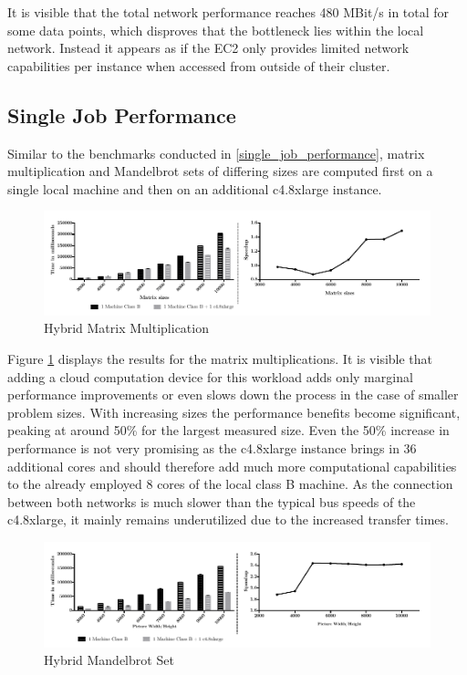 It is visible that the total network performance reaches 480 MBit/s in total for some data points, which disproves that the bottleneck lies within the local network. Instead it appears as if the EC2 only provides limited network capabilities per instance when accessed from outside of their cluster.

\subsection{Single Job Performance}

Similar to the benchmarks conducted in \ref{single_job_performance}, matrix multiplication and Mandelbrot sets of differing sizes are computed first on a single local machine and then on an additional c4.8xlarge instance.

\begin{figure}[H]
	\includegraphics[width=1.0\textwidth]{images/hybrid_matrix_multiplication.pdf}
	\centering
	\caption{Hybrid Matrix Multiplication}
	\label{img:hybrid_matrix_multiplication}
\end{figure}

Figure \ref{img:hybrid_matrix_multiplication} displays the results for the matrix multiplications. It is visible that adding a cloud computation device for this workload adds only marginal performance improvements or even slows down the process in the case of smaller problem sizes. With increasing sizes the performance benefits become significant, peaking at around 50\% for the largest measured size. Even the 50\% increase in performance is not very promising as the c4.8xlarge instance brings in 36 additional cores and should therefore add much more computational capabilities to the already employed 8 cores of the local class B machine. As the connection between both networks is much slower than the typical bus speeds of the c4.8xlarge, it mainly remains underutilized due to the increased transfer times.


\begin{figure}[H]	
	\includegraphics[width=1.0\textwidth]{images/hybrid_mandelbrot_performance.pdf}
	\centering
	\caption{Hybrid Mandelbrot Set}
	\label{img:hybrid_mandelbrot}
\end{figure}


